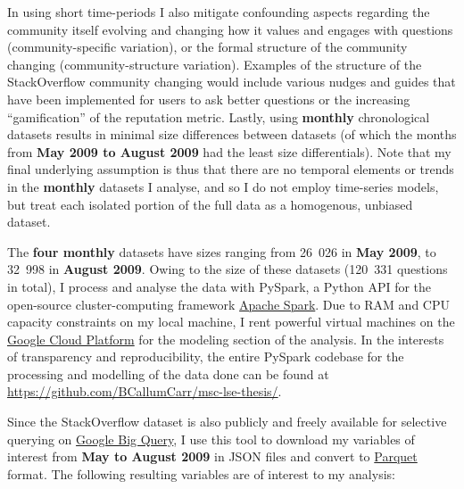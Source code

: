 \documentclass[11pt,preprint, authoryear]{article}
\numberwithin{equation}{section}
\begin{document}
In using short time-periods I also mitigate confounding aspects
regarding the community itself evolving and changing how it values and
engages with questions (community-specific variation), or the formal
structure of the community changing (community-structure variation).
Examples of the structure of the StackOverflow community changing would
include various nudges and guides that have been implemented for users
to ask better questions or the increasing ``gamification'' of the
reputation metric. Lastly, using \textbf{monthly} chronological datasets
results in minimal size differences between datasets (of which the
months from \textbf{May 2009 to August 2009} had the least size
differentials). Note that my final underlying assumption is thus that
there are no temporal elements or trends in the \textbf{monthly}
datasets I analyse, and so I do not employ time-series models, but treat
each isolated portion of the full data as a homogenous, unbiased
dataset.

The \textbf{four monthly} datasets have sizes ranging from 26~026 in
\textbf{May 2009}, to 32~998 in \textbf{August 2009}. Owing to the size
of these datasets (120~331 questions in total), I process and analyse
the data with PySpark, a Python API for the open-source
cluster-computing framework \href{http://spark.apache.org}{Apache
Spark}. Due to RAM and CPU capacity constraints on my local machine, I
rent powerful virtual machines on the
\href{https://cloud.google.com/}{Google Cloud Platform} for the modeling
section of the analysis. In the interests of transparency and
reproducibility, the entire PySpark codebase for the processing and
modelling of the data done can be found at
\url{https://github.com/BCallumCarr/msc-lse-thesis/}.

Since the StackOverflow dataset is also publicly and freely available
for selective querying on
\href{https://cloud.google.com/bigquery}{Google Big Query}, I use this
tool to download my variables of interest from \textbf{May to August
2009} in JSON files and convert to
\href{https://parquet.apache.org}{Parquet} format. The following
resulting variables are of interest to my analysis:

\end{document}
